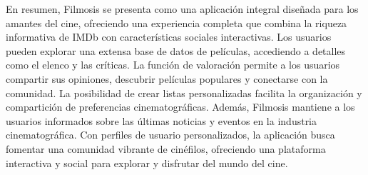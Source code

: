 \documentclass{article}
\begin{document}
    En resumen, Filmosis se presenta como una aplicación integral diseñada para los amantes del cine, ofreciendo una experiencia completa que combina la riqueza informativa de IMDb con características sociales interactivas. Los usuarios pueden explorar una extensa base de datos de películas, accediendo a detalles como el elenco y las críticas. La función de valoración permite a los usuarios compartir sus opiniones, descubrir películas populares y conectarse con la comunidad. La posibilidad de crear listas personalizadas facilita la organización y compartición de preferencias cinematográficas. Además, Filmosis mantiene a los usuarios informados sobre las últimas noticias y eventos en la industria cinematográfica. Con perfiles de usuario personalizados, la aplicación busca fomentar una comunidad vibrante de cinéfilos, ofreciendo una plataforma interactiva y social para explorar y disfrutar del mundo del cine.
\end{document}

